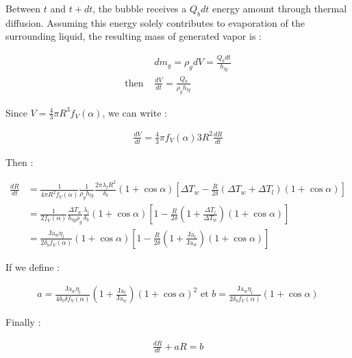 \npar
Between $t$ and $t+dt$, the bubble receives a $Q_{b}dt$ energy amount through thermal diffusion. Assuming this energy solely contributes to evaporation of the surrounding liquid, the resulting mass of generated vapor is :

\begin{align}
&dm_{g} = \rho_{g} dV = \frac{Q_{b}dt}{h_{lg}}\\
\text{then } &\frac{dV}{dt}=\frac{Q_{b}}{\rho_{g}h_{lg}}
\end{align}

Since $V=\frac{4}{3}\pi R^{3} f_{V}\left(\alpha\right)$, we can write : 

\begin{align}
\frac{dV}{dt}=\frac{4}{3}\pi f_{V}\left(\alpha\right) 3R^{2}\frac{dR}{dt}
\end{align}

Then :

\begin{align}
\frac{dR}{dt}&=\frac{1}{4\pi R^{2}f_{V}\left(\alpha\right)} \frac{1}{\rho_{g} h_{lg}} \frac{2 \pi \lambda_{l} R^{2}}{\delta_{b}}\left(1+\cos{\alpha}\right)\left[\Delta T_{w} - \frac{R}{2\delta}\left(\Delta T_{w} + \Delta T_{l}\right) \left(1 + \cos{\alpha} \right )\right]\\
&= \frac{1}{2f_{V}\left(\alpha\right)}\frac{\Delta T_{w}}{h_{lg}\rho_{g}}\frac{\lambda_{l}}{\delta_{b}}\left(1+\cos{\alpha}\right)\left[1 - \frac{R}{2\delta}\left(1 + \frac{\Delta T_{l}}{\Delta T_{w}}\right) \left(1 + \cos {\alpha} \right )\right]\\
&=\frac{\text{Ja}_{w} \eta_{l}}{2 \delta_{b} f_{V}\left(\alpha\right)}\left(1+\cos{\alpha}\right)\left[1 - \frac{R}{2\delta}\left(1 + \frac{\text{Ja}_{l}}{\text{Ja}_{w}}\right) \left(1 + \cos{\alpha} \right )\right]
\end{align}

If we define :

\begin{align}
a = \frac{\text{Ja}_{w}\eta_{l}}{4 \delta_{b} \delta f_{V} \left(\alpha\right)} \left(1 + \frac{\text{Ja}_{l}}{\text{Ja}_{w}}\right) \left(1 + \cos{\alpha}\right)^{2} \text{ et } b = \frac{\text{Ja}_{w}\eta_{l}}{2 \delta_{b} f_{V}\left(\alpha\right)}\left(1 + \cos{\alpha}\right)
\end{align}

Finally : 

\begin{align}
\frac{dR}{dt} + aR = b
\end{align}


